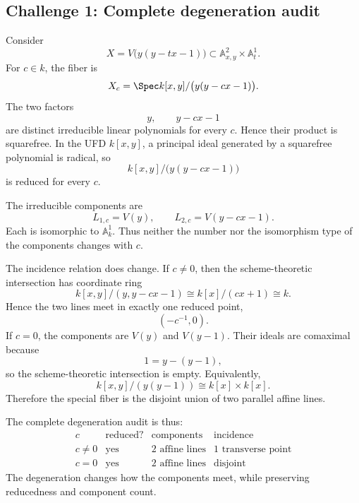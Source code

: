 \subsection*{Challenge 1: Complete degeneration audit}
\begin{solution}
Consider
\[
X=V\bigl(y(y-tx-1)\bigr)\subset\mathbb A^2_{x,y}\times\mathbb A^1_t.
\]
For \(c\in k\), the fiber is
\[
X_c=\Spec k[x,y]/\bigl(y(y-cx-1)\bigr).
\]
The two factors
\[
y,\qquad y-cx-1
\]
are distinct irreducible linear polynomials for every \(c\).  Hence their product is squarefree.  In the UFD \(k[x,y]\), a principal ideal generated by a squarefree polynomial is radical, so
\[
k[x,y]/\bigl(y(y-cx-1)\bigr)
\]
is reduced for every \(c\).

The irreducible components are
\[
L_{1,c}=V(y),\qquad
L_{2,c}=V(y-cx-1).
\]
Each is isomorphic to \(\mathbb A^1_k\).  Thus neither the number nor the isomorphism type of the components changes with \(c\).

The incidence relation does change.  If \(c\ne0\), then the scheme-theoretic intersection has coordinate ring
\[
k[x,y]/(y,y-cx-1)
\cong
k[x]/(cx+1)
\cong
k.
\]
Hence the two lines meet in exactly one reduced point,
\[
(-c^{-1},0).
\]
If \(c=0\), the components are \(V(y)\) and \(V(y-1)\).  Their ideals are comaximal because
\[
1=y-(y-1),
\]
so the scheme-theoretic intersection is empty.  Equivalently,
\[
k[x,y]/(y(y-1))
\cong
k[x]\times k[x].
\]
Therefore the special fiber is the disjoint union of two parallel affine lines.

The complete degeneration audit is thus:
\[
\begin{array}{c|c|c|c}
c & \text{reduced?} & \text{components} & \text{incidence}\\ \hline
c\ne0 & \text{yes} & 2\text{ affine lines} & 1\text{ transverse point}\\
c=0 & \text{yes} & 2\text{ affine lines} & \text{disjoint}
\end{array}
\]
The degeneration changes how the components meet, while preserving reducedness and component count.
\end{solution}

